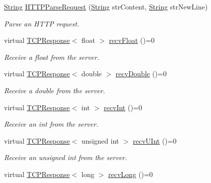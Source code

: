 \begin{DoxyCompactItemize}
\hyperlink{class_rad_j_a_v_1_1_string}{String} \hyperlink{class_rad_j_a_v_1_1_networking_1_1_tcpip_client_ae462f01cc5fbb9bfed9617857015002b}{H\+T\+T\+P\+Parse\+Request} (\hyperlink{class_rad_j_a_v_1_1_string}{String} str\+Content, \hyperlink{class_rad_j_a_v_1_1_string}{String} str\+New\+Line)
\begin{DoxyCompactList}\small\item\em Parse an H\+T\+TP request. \end{DoxyCompactList}\item 
virtual \hyperlink{class_rad_j_a_v_1_1_networking_1_1_t_c_p_response}{T\+C\+P\+Response}$<$ float $>$ \hyperlink{class_rad_j_a_v_1_1_networking_1_1_tcpip_client_acb02176a777a6f3dd05bf48c51e40c7b}{recv\+Float} ()=0
\begin{DoxyCompactList}\small\item\em Receive a float from the server. \end{DoxyCompactList}\item 
virtual \hyperlink{class_rad_j_a_v_1_1_networking_1_1_t_c_p_response}{T\+C\+P\+Response}$<$ double $>$ \hyperlink{class_rad_j_a_v_1_1_networking_1_1_tcpip_client_ab29ea3c5ca1efc4f2d21f724fbadf068}{recv\+Double} ()=0
\begin{DoxyCompactList}\small\item\em Receive a double from the server. \end{DoxyCompactList}\item 
virtual \hyperlink{class_rad_j_a_v_1_1_networking_1_1_t_c_p_response}{T\+C\+P\+Response}$<$ int $>$ \hyperlink{class_rad_j_a_v_1_1_networking_1_1_tcpip_client_a603ea8bc629629e78de34a9fed9ae762}{recv\+Int} ()=0
\begin{DoxyCompactList}\small\item\em Receive an int from the server. \end{DoxyCompactList}\item 
virtual \hyperlink{class_rad_j_a_v_1_1_networking_1_1_t_c_p_response}{T\+C\+P\+Response}$<$ unsigned int $>$ \hyperlink{class_rad_j_a_v_1_1_networking_1_1_tcpip_client_a6baae414514a4577b6e931c7a8b621fa}{recv\+U\+Int} ()=0
\begin{DoxyCompactList}\small\item\em Receive an unsigned int from the server. \end{DoxyCompactList}\item 
virtual \hyperlink{class_rad_j_a_v_1_1_networking_1_1_t_c_p_response}{T\+C\+P\+Response}$<$ long $>$ \hyperlink{class_rad_j_a_v_1_1_networking_1_1_tcpip_client_a3c569e6a3da7e9925647af11a2f6e67e}{recv\+Long} ()=0

\end{DoxyCompactItemize}
